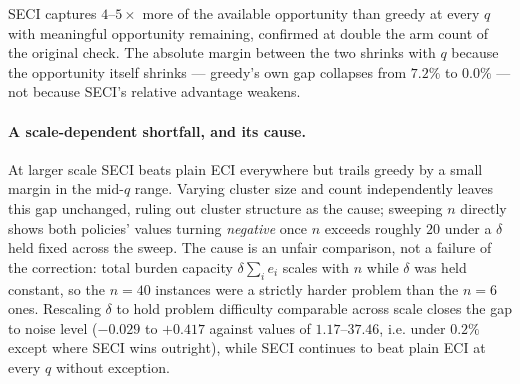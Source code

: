 SECI captures $4$--$5\times$ more of the available opportunity than greedy at
every $q$ with meaningful opportunity remaining, confirmed at double the arm
count of the original check. The absolute margin between the two shrinks with
$q$ because the opportunity itself shrinks --- greedy's own gap collapses from
$7.2\%$ to $0.0\%$ --- not because SECI's relative advantage weakens.

\paragraph{A scale-dependent shortfall, and its cause.} At larger scale SECI
beats plain ECI everywhere but trails greedy by a small margin in the mid-$q$
range. Varying cluster size and count independently leaves this gap unchanged,
ruling out cluster structure as the cause; sweeping $n$ directly shows both
policies' values turning \emph{negative} once $n$ exceeds roughly $20$ under a
$\delta$ held fixed across the sweep. The cause is an unfair comparison, not a
failure of the correction:
total burden capacity $\delta\sum_i e_i$ scales with $n$ while $\delta$ was held
constant, so the $n=40$ instances were a strictly harder problem than the $n=6$
ones. Rescaling $\delta$ to hold problem difficulty comparable across scale closes
the gap to noise level ($-0.029$ to $+0.417$ against values of $1.17$--$37.46$,
i.e. under $0.2\%$ except where SECI wins outright), while SECI continues to beat
plain ECI at every $q$ without exception.
